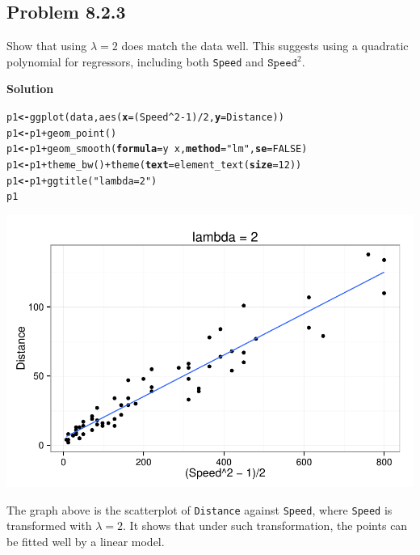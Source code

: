 \documentclass[12pt,oneside,a4paper]{article}\usepackage[]{graphicx}\usepackage[]{xcolor}
\makeatletter
\newcommand{\hlnum}[1]{\textcolor[rgb]{0,0,0}{#1}}%
\newcommand{\hlstr}[1]{\textcolor[rgb]{0,0,1}{#1}}%
\newcommand{\hlopt}[1]{\textcolor[rgb]{0,0,0}{#1}}%
\newcommand{\hlstd}[1]{\textcolor[rgb]{0,0,0}{#1}}%
\newcommand{\hlkwb}[1]{\textcolor[rgb]{0.498,0,0.333}{\textbf{#1}}}%
\newcommand{\hlkwc}[1]{\textcolor[rgb]{0.498,0,0.333}{\textbf{#1}}}%
\newcommand{\hlkwd}[1]{\textcolor[rgb]{0,0,0}{#1}}%
\newenvironment{kframe}{%
 \def\at@end@of@kframe{}%
 \ifinner\ifhmode%
  \def\at@end@of@kframe{\end{minipage}}%
  \begin{minipage}{\columnwidth}%
 \fi\fi%
 \def\FrameCommand##1{\hskip\@totalleftmargin \hskip-\fboxsep
 \colorbox{shadecolor}{##1}\hskip-\fboxsep
     \hskip-\linewidth \hskip-\@totalleftmargin \hskip\columnwidth}%
 \MakeFramed {\advance\hsize-\width
   \@totalleftmargin\z@ \linewidth\hsize
   \@setminipage}}%
 {\par\unskip\endMakeFramed%
 \at@end@of@kframe}
\newenvironment{knitrout}{}{} %
\newcommand{\subproblem}[1]
{
    \subsection*{Problem {#1}}
}
\newcommand{\solution}
{
    \vspace{15pt}
    \noindent\ignorespaces\textbf{\large Solution}
}
\newcommand{\m}[1]{\texttt{{#1}}}
\makeatother
\begin{document}
\subproblem{8.2.3}
Show that using $\lambda = 2$ does match the data well. This suggests using a quadratic polynomial for regressors, including both \m{Speed} and $\m{Speed}^2$.

\solution
\begin{knitrout}
\color{fgcolor}\begin{kframe}
\begin{alltt}
\hlstd{p1} \hlkwb{<-} \hlkwd{ggplot}\hlstd{(data,} \hlkwd{aes}\hlstd{(}\hlkwc{x} \hlstd{= (Speed} \hlopt{^} \hlnum{2} \hlopt{-} \hlnum{1}\hlstd{)}\hlopt{/}\hlnum{2}\hlstd{,} \hlkwc{y} \hlstd{= Distance))}
\hlstd{p1} \hlkwb{<-} \hlstd{p1} \hlopt{+} \hlkwd{geom_point}\hlstd{()}
\hlstd{p1} \hlkwb{<-} \hlstd{p1} \hlopt{+} \hlkwd{geom_smooth}\hlstd{(}\hlkwc{formula} \hlstd{= y} \hlopt{~} \hlstd{x,} \hlkwc{method} \hlstd{=} \hlstr{"lm"}\hlstd{,} \hlkwc{se} \hlstd{=} \hlnum{FALSE}\hlstd{)}
\hlstd{p1} \hlkwb{<-} \hlstd{p1} \hlopt{+} \hlkwd{theme_bw}\hlstd{()} \hlopt{+} \hlkwd{theme}\hlstd{(}\hlkwc{text} \hlstd{=} \hlkwd{element_text}\hlstd{(}\hlkwc{size} \hlstd{=} \hlnum{12}\hlstd{))}
\hlstd{p1} \hlkwb{<-} \hlstd{p1} \hlopt{+} \hlkwd{ggtitle}\hlstd{(}\hlstr{"lambda = 2"}\hlstd{)}
\hlstd{p1}
\end{alltt}
\end{kframe}

{\centering \includegraphics[width=.8\linewidth]{figure/p823} 

}



\end{knitrout}

The graph above is the scatterplot of \m{Distance} against \m{Speed}, where \m{Speed} is transformed with $\lambda = 2$. It shows that under such transformation, the points can be fitted well by a linear model.
\end{document}
